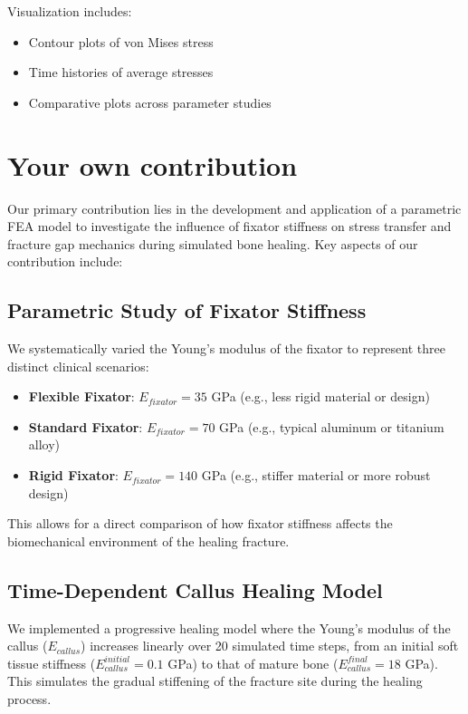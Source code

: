 \documentclass{article}
\begin{document}
Visualization includes:
\begin{itemize}
  \item Contour plots of von Mises stress
  \item Time histories of average stresses
  \item Comparative plots across parameter studies
\end{itemize}


\section{Your own contribution}

Our primary contribution lies in the development and application of a parametric FEA model to investigate the influence of fixator stiffness on stress transfer and fracture gap mechanics during simulated bone healing. Key aspects of our contribution include:

\subsection{Parametric Study of Fixator Stiffness}
We systematically varied the Young's modulus of the fixator to represent three distinct clinical scenarios:
\begin{itemize}
  \item \textbf{Flexible Fixator}: $E_{fixator} = 35$ GPa (e.g., less rigid material or design)
  \item \textbf{Standard Fixator}: $E_{fixator} = 70$ GPa (e.g., typical aluminum or titanium alloy)
  \item \textbf{Rigid Fixator}: $E_{fixator} = 140$ GPa (e.g., stiffer material or more robust design)
\end{itemize}
This allows for a direct comparison of how fixator stiffness affects the biomechanical environment of the healing fracture.

\subsection{Time-Dependent Callus Healing Model}
We implemented a progressive healing model where the Young's modulus of the callus ($E_{callus}$) increases linearly over 20 simulated time steps, from an initial soft tissue stiffness ($E_{callus}^{initial} = 0.1$ GPa) to that of mature bone ($E_{callus}^{final} = 18$ GPa). This simulates the gradual stiffening of the fracture site during the healing process.
\end{document}
